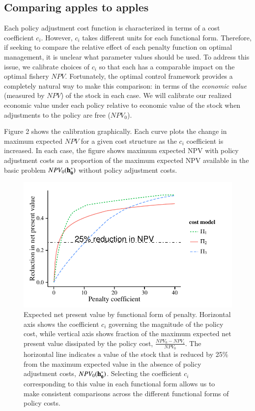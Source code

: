 \documentclass[review,12pt,author-year,titlepage]{components/elsarticle} %
\makeatletter
\def\maxwidth{\ifdim\Gin@nat@width>\linewidth\linewidth
\else\Gin@nat@width\fi}
\let\Oldincludegraphics\includegraphics
\renewcommand{\includegraphics}[1]{\Oldincludegraphics[width=\maxwidth]{#1}}
\makeatother
\begin{document}
\begin{flushleft}
\subsection{Comparing apples to
apples}\label{comparing-apples-to-apples}

Each policy adjustment cost function is characterized in terms of a cost
coefficient \(c_i\). However, \(c_i\) takes different units for each
functional form. Therefore, if seeking to compare the relative effect of
each penalty function on optimal management, it is unclear what
parameter values should be used. To address this issue, we calibrate
choices of \(c_i\) so that each has a comparable impact on the optimal
fishery \(NPV\). Fortunately, the optimal control framework provides a
completely natural way to make this comparison: in terms of the
\emph{economic value} (measured by \(NPV\)) of the stock in each case.
We will calibrate our realized economic value under each policy relative
to economic value of the stock when adjustments to the policy are free
(\(NPV_0\)).

Figure 2 shows the calibration graphically. Each curve plots the change
in maximum expected \(NPV\) for a given cost structure as the \(c_i\)
coefficient is increased. In each case, the figure shows maximum
expected NPV with policy adjustment costs as a proportion of the maximum
expected NPV available in the basic problem \(NPV_0({\bf h_0^*})\)
without policy adjustment costs.

\begin{figure}[htbp]
\centering
\includegraphics{components/figure/manuscript-Figure_2-1.pdf}
\caption{Expected net present value by functional form of penalty.
Horizontal axis shows the coefficient \(c_i\) governing the magnitude of
the policy cost, while vertical axis shows fraction of the maximum
expected net present value dissipated by the policy cost,
\(\tfrac{NPV_0 - NPV_i}{NPV_0}\). The horizontal line indicates a value
of the stock that is reduced by 25\% from the maximum expected value in
the absence of policy adjustment costs, \(NPV_0({\bf h_0^*})\).
Selecting the coefficient \(c_i\) corresponding to this value in each
functional form allows us to make consistent comparisons across the
different functional forms of policy costs.}
\end{figure}


\end{flushleft}
\end{document}
